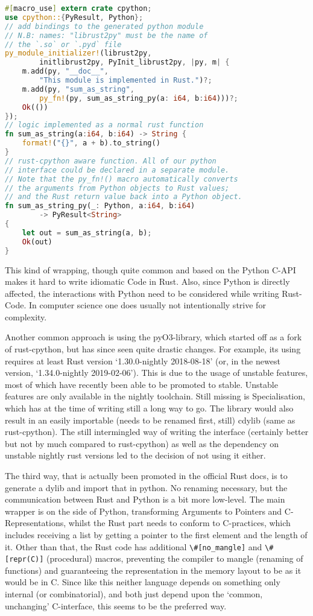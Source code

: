 \vline
\begin{lstlisting}[language=Rust]
#[macro_use] extern crate cpython;
use cpython::{PyResult, Python};
// add bindings to the generated python module
// N.B: names: "librust2py" must be the name of
// the `.so` or `.pyd` file
py_module_initializer!(librust2py,
        initlibrust2py, PyInit_librust2py, |py, m| {
    m.add(py, "__doc__",
        "This module is implemented in Rust.")?;
    m.add(py, "sum_as_string",
        py_fn!(py, sum_as_string_py(a: i64, b:i64)))?;
    Ok(())
});
// logic implemented as a normal rust function
fn sum_as_string(a:i64, b:i64) -> String {
    format!("{}", a + b).to_string()
}
// rust-cpython aware function. All of our python
// interface could be declared in a separate module.
// Note that the py_fn!() macro automatically converts
// the arguments from Python objects to Rust values;
// and the Rust return value back into a Python object.
fn sum_as_string_py(_: Python, a:i64, b:i64)
        -> PyResult<String>
{
    let out = sum_as_string(a, b);
    Ok(out)
}
\end{lstlisting}
\vline

This kind of wrapping, though quite common and based on the Python C-API makes
it hard to write idiomatic Code in Rust. Also, since Python is directly
affected, the interactions with Python need to be considered while writing
Rust-Code. In computer science one does usually not intentionally strive for
complexity.

Another common approach is using the pyO3-library, which started off as a fork
of rust-cpython, but has since seen quite drastic changes. For example, its
using requires at least Rust version ‘1.30.0-nightly 2018-08-18’ (or, in the
newest version, ‘1.34.0-nightly 2019-02-06’). This is due to the usage of
unstable features, most of which have recently been able to be promoted to
stable. Unstable features are only available in the nightly toolchain.  Still
missing is Specialisation, which has at the time of writing still a long way to
go.  The library would also result in an easily importable (needs to be renamed
first, still) cdylib (same as rust-cpython). The still intermingled way of
writing the interface (certainly better but not by much compared to
rust-cpython) as well as the dependency on unstable nightly rust versions led
to the decision of not using it either.

The third way, that is actually been promoted in the official Rust docs, is to
generate a dylib and import that in python. No renaming necessary, but the
communication between Rust and Python is a bit more low-level. The main wrapper
is on the side of Python, transforming Arguments to Pointers and
C-Representations, whilst the Rust part needs to conform to C-practices, which
includes receiving a list by getting a pointer to the first element and the
length of it. Other than that, the Rust code has additional
\verb!\#[no_mangle]! and \verb!\#[repr(C)]!  (procedural) macros, preventing
the compiler to mangle (renaming of functions) and guaranteeing the
representation in the memory layout to be as it would be in C. Since like this
neither language depends on something only internal (or combinatorial), and
both just depend upon the ‘common, unchanging’ C-interface, this seems to be
the preferred way.  



